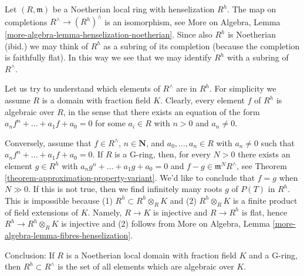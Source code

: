 \begin{example}
\label{example-describe-henselian}
Let $(R, \mathfrak m)$ be a Noetherian local ring with henselization $R^h$.
The map on completions $R^\wedge \to (R^h)^\wedge$ is an isomorphism, see
More on Algebra, Lemma \ref{more-algebra-lemma-henselization-noetherian}.
Since also $R^h$ is Noetherian (ibid.) we may think of $R^h$ as a subring
of its completion (because the completion is faithfully flat). In this way
we see that we may identify $R^h$ with a subring of $R^\wedge$.

\medskip\noindent
Let us try to understand which elements of $R^\wedge$ are in $R^h$. For
simplicity we assume $R$ is a domain with fraction field $K$. Clearly,
every element $f$ of $R^h$ is algebraic over $R$, in the sense that
there exists an equation of the form $a_n f^n + \ldots + a_1 f + a_0 = 0$
for some $a_i \in R$ with $n > 0$ and $a_n \not = 0$.

\medskip\noindent
Conversely, assume that $f \in R^\wedge$, $n \in \mathbf{N}$, and
$a_0, \ldots, a_n \in R$ with $a_n \not = 0$ such that
$a_n f^n + \ldots + a_1 f + a_0 = 0$. If $R$ is a G-ring, then, for
every $N > 0$ there exists an element $g \in R^h$ with
$a_n g^n + \ldots + a_1 g + a_0 = 0$ and $f - g \in \mathfrak m^N R^\wedge$,
see Theorem \ref{theorem-approximation-property-variant}.
We'd like to conclude that $f = g$ when $N \gg 0$.
If this is not true, then we find infinitely many roots $g$ of $P(T)$
in $R^h$. This is impossible because (1) $R^h \subset R^h \otimes_R K$
and (2) $R^h \otimes_R K$ is a finite product of field extensions of $K$.
Namely, $R \to K$ is injective and $R \to R^h$ is flat, hence
$R^h \to R^h \otimes_R K$ is injective and (2) follows from
More on Algebra, Lemma \ref{more-algebra-lemma-fibres-henselization}.

\medskip\noindent
Conclusion: If $R$ is a Noetherian local domain with fraction field $K$
and a G-ring, then $R^h \subset R^\wedge$ is the set of all elements which
are algebraic over $K$.
\end{example}












